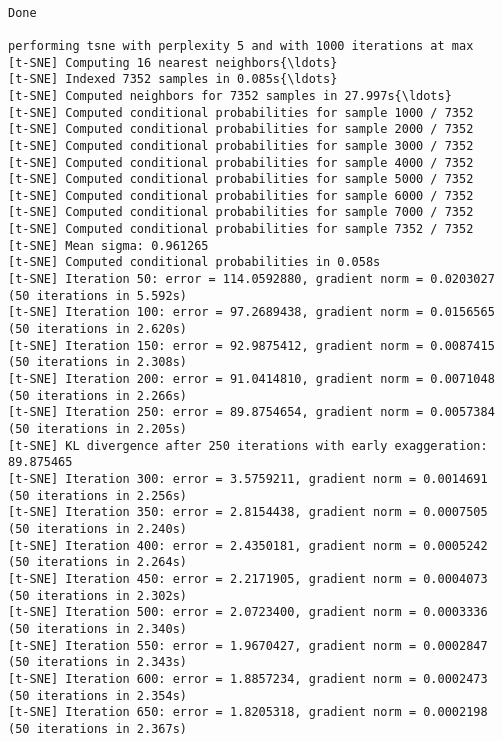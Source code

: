 \documentclass[11pt]{article}
\begin{document}
    \begin{center}
    \end{center}
    { \hspace*{\fill} \\}
    
    \begin{Verbatim}[commandchars=\\\{\}]
Done

performing tsne with perplexity 5 and with 1000 iterations at max
[t-SNE] Computing 16 nearest neighbors{\ldots}
[t-SNE] Indexed 7352 samples in 0.085s{\ldots}
[t-SNE] Computed neighbors for 7352 samples in 27.997s{\ldots}
[t-SNE] Computed conditional probabilities for sample 1000 / 7352
[t-SNE] Computed conditional probabilities for sample 2000 / 7352
[t-SNE] Computed conditional probabilities for sample 3000 / 7352
[t-SNE] Computed conditional probabilities for sample 4000 / 7352
[t-SNE] Computed conditional probabilities for sample 5000 / 7352
[t-SNE] Computed conditional probabilities for sample 6000 / 7352
[t-SNE] Computed conditional probabilities for sample 7000 / 7352
[t-SNE] Computed conditional probabilities for sample 7352 / 7352
[t-SNE] Mean sigma: 0.961265
[t-SNE] Computed conditional probabilities in 0.058s
[t-SNE] Iteration 50: error = 114.0592880, gradient norm = 0.0203027 (50 iterations in 5.592s)
[t-SNE] Iteration 100: error = 97.2689438, gradient norm = 0.0156565 (50 iterations in 2.620s)
[t-SNE] Iteration 150: error = 92.9875412, gradient norm = 0.0087415 (50 iterations in 2.308s)
[t-SNE] Iteration 200: error = 91.0414810, gradient norm = 0.0071048 (50 iterations in 2.266s)
[t-SNE] Iteration 250: error = 89.8754654, gradient norm = 0.0057384 (50 iterations in 2.205s)
[t-SNE] KL divergence after 250 iterations with early exaggeration: 89.875465
[t-SNE] Iteration 300: error = 3.5759211, gradient norm = 0.0014691 (50 iterations in 2.256s)
[t-SNE] Iteration 350: error = 2.8154438, gradient norm = 0.0007505 (50 iterations in 2.240s)
[t-SNE] Iteration 400: error = 2.4350181, gradient norm = 0.0005242 (50 iterations in 2.264s)
[t-SNE] Iteration 450: error = 2.2171905, gradient norm = 0.0004073 (50 iterations in 2.302s)
[t-SNE] Iteration 500: error = 2.0723400, gradient norm = 0.0003336 (50 iterations in 2.340s)
[t-SNE] Iteration 550: error = 1.9670427, gradient norm = 0.0002847 (50 iterations in 2.343s)
[t-SNE] Iteration 600: error = 1.8857234, gradient norm = 0.0002473 (50 iterations in 2.354s)
[t-SNE] Iteration 650: error = 1.8205318, gradient norm = 0.0002198 (50 iterations in 2.367s)

\end{Verbatim}
\end{document}
